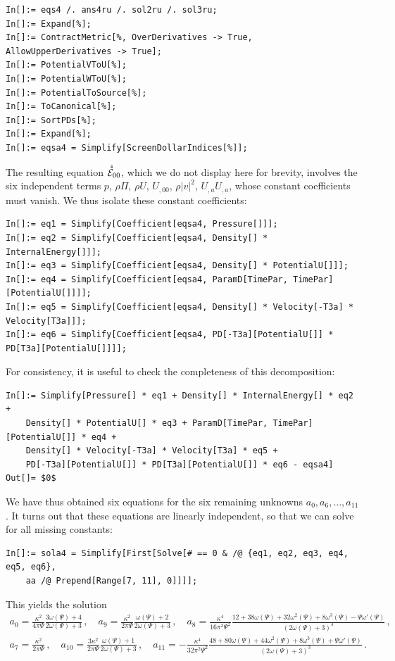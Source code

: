 \documentclass[notitlepage,a4paper,aps,prd,onecolumn,superscriptaddress,nofootinbib,groupedaddress,longbibliography]{revtex4-1}
\newcommand{\order}[2]{\accentset{#2}{#1}}
\begin{document}
\begin{lstlisting}
In[]:= eqs4 /. ans4ru /. sol2ru /. sol3ru;
In[]:= Expand[%];
In[]:= ContractMetric[%, OverDerivatives -> True, AllowUpperDerivatives -> True];
In[]:= PotentialVToU[%];
In[]:= PotentialWToU[%];
In[]:= PotentialToSource[%];
In[]:= ToCanonical[%];
In[]:= SortPDs[%];
In[]:= Expand[%];
In[]:= eqsa4 = Simplify[ScreenDollarIndices[%]];
\end{lstlisting}
The resulting equation \(\order{\mathcal{E}}{4}_{00}\), which we do not display here for brevity, involves the six independent terms \(p\), \(\rho\Pi\), \(\rho U\), \(U_{,00}\), \(\rho|v|^2\), \(U_{,a}U_{,a}\), whose constant coefficients must vanish. We thus isolate these constant coefficients:
\begin{lstlisting}
In[]:= eq1 = Simplify[Coefficient[eqsa4, Pressure[]]];
In[]:= eq2 = Simplify[Coefficient[eqsa4, Density[] * InternalEnergy[]]];
In[]:= eq3 = Simplify[Coefficient[eqsa4, Density[] * PotentialU[]]];
In[]:= eq4 = Simplify[Coefficient[eqsa4, ParamD[TimePar, TimePar][PotentialU[]]]];
In[]:= eq5 = Simplify[Coefficient[eqsa4, Density[] * Velocity[-T3a] * Velocity[T3a]]];
In[]:= eq6 = Simplify[Coefficient[eqsa4, PD[-T3a][PotentialU[]] * PD[T3a][PotentialU[]]]];
\end{lstlisting}
For consistency, it is useful to check the completeness of this decomposition:
\begin{lstlisting}
In[]:= Simplify[Pressure[] * eq1 + Density[] * InternalEnergy[] * eq2 +
	Density[] * PotentialU[] * eq3 + ParamD[TimePar, TimePar][PotentialU[]] * eq4 +
	Density[] * Velocity[-T3a] * Velocity[T3a] * eq5 +
	PD[-T3a][PotentialU[]] * PD[T3a][PotentialU[]] * eq6 - eqsa4]
Out[]= $0$
\end{lstlisting}
We have thus obtained six equations for the six remaining unknowns \(a_0, a_6, \ldots, a_{11}\). It turns out that these equations are linearly independent, so that we can solve for all missing constants:
\begin{lstlisting}
In[]:= sola4 = Simplify[First[Solve[# == 0 & /@ {eq1, eq2, eq3, eq4, eq5, eq6},
	aa /@ Prepend[Range[7, 11], 0]]]];
\end{lstlisting}
This yields the solution
\begin{gather}
a_0 = \frac{\kappa^2}{4\pi\Psi}\frac{3\omega(\Psi) + 4}{2\omega(\Psi) + 3}\,, \quad
a_9 = \frac{\kappa^2}{2\pi\Psi}\frac{\omega(\Psi) + 2}{2\omega(\Psi) + 3}\,, \quad
a_8 = \frac{\kappa^4}{16\pi^2\Psi^2}\frac{12 + 38\omega(\Psi) + 32\omega^2(\Psi) + 8\omega^3(\Psi) - \Psi\omega'(\Psi)}{(2\omega(\Psi) + 3)^3}\,,\nonumber\\
a_7 = \frac{\kappa^2}{2\pi\Psi}\,, \quad
a_{10} = \frac{3\kappa^2}{2\pi\Psi}\frac{\omega(\Psi) + 1}{2\omega(\Psi) + 3}\,, \quad
a_{11} = -\frac{\kappa^4}{32\pi^2\Psi^2}\frac{48 + 80\omega(\Psi) + 44\omega^2(\Psi) + 8\omega^3(\Psi) + \Psi\omega'(\Psi)}{(2\omega(\Psi) + 3)^3}\,.
\end{gather}
\end{document}
